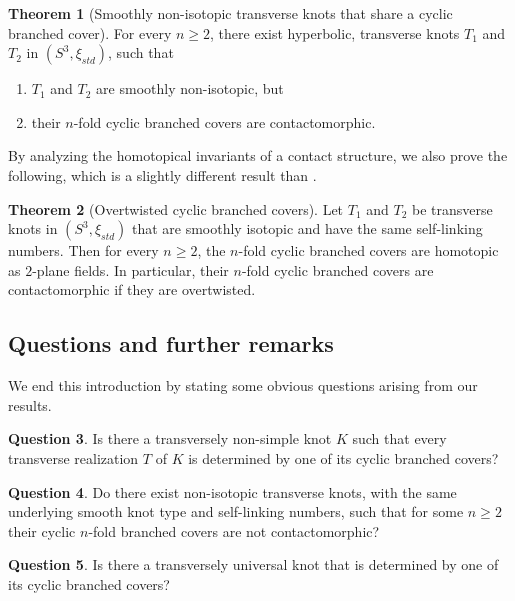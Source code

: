\documentclass[11pt]{amsart}
\theoremstyle{definition}
\theoremstyle{definition}
\theoremstyle{definition}
\theoremstyle{definition}
\newtheorem{theorem}{Theorem}[section]
\newtheorem{question}[theorem]{Question}
\begin{document}
\begin{theorem}[Smoothly non-isotopic transverse knots that share a cyclic branched cover] \label{thm:Nakanishi_Sakuma}
    For every $n\geq 2$, there exist hyperbolic, transverse knots $T_1$ and $T_2$ in $(S^3,\xi_{std})$, such that
    \begin{enumerate}
        \item $T_1$ and $T_2$ are smoothly non-isotopic, but
        \item their $n$-fold cyclic branched covers are contactomorphic.
    \end{enumerate}
\end{theorem}

By analyzing the homotopical invariants of a contact structure, we also prove the following, which is a slightly different result than \cite{Harvey_br_covers}.

\begin{theorem}[Overtwisted cyclic branched covers] \label{thm:OT}
Let $T_1$ and $T_2$ be transverse knots in $(S^3,\xi_{std})$ that are smoothly isotopic and have the same self-linking numbers. Then for every $n\geq 2$, the $n$-fold cyclic branched covers are homotopic as $2$-plane fields. In particular, their $n$-fold cyclic branched covers are contactomorphic if they are overtwisted.
\end{theorem}

\subsection{Questions and further remarks}
We end this introduction by stating some obvious questions arising from our results.

 \begin{question}
     Is there a transversely non-simple knot $K$ such that every transverse realization $T$ of $K$ is determined by one of its cyclic branched covers?
 \end{question}

 \begin{question}
     Do there exist non-isotopic transverse knots, with the same underlying smooth knot type and self-linking numbers, such that for some $n\geq2$ their cyclic $n$-fold branched covers are not contactomorphic? 
 \end{question}

 \begin{question}
     Is there a transversely universal knot that is determined by one of its cyclic branched covers?
 \end{question}
\end{document}

